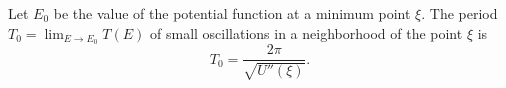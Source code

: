 Let $E_0$ be the value of the potential function at a minimum point $\xi$.
The period $T_0 = \lim_{E \to E_0} T(E)$ of small oscillations in a neighborhood of the point $\xi$ is
$$T_0 = \frac{2\pi}{\sqrt{U''(\xi)}}.$$
